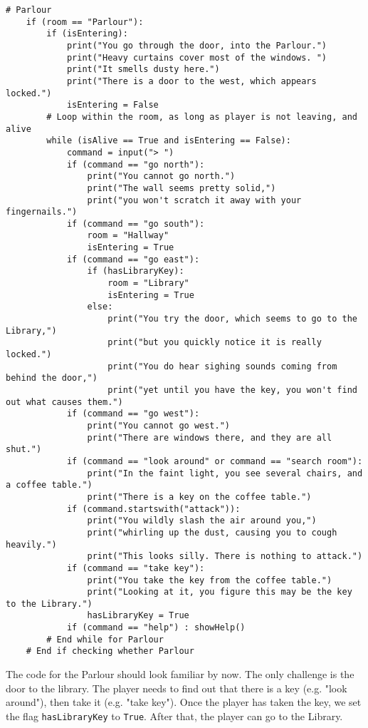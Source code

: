 \begin{lstlisting}[firstnumber=last]
    # Parlour
    if (room == "Parlour"):
        if (isEntering):
            print("You go through the door, into the Parlour.")
            print("Heavy curtains cover most of the windows. ")
            print("It smells dusty here.")
            print("There is a door to the west, which appears locked.")
            isEntering = False
        # Loop within the room, as long as player is not leaving, and alive
        while (isAlive == True and isEntering == False):
            command = input("> ")
            if (command == "go north"):
                print("You cannot go north.")
                print("The wall seems pretty solid,")
                print("you won't scratch it away with your fingernails.")
            if (command == "go south"):
                room = "Hallway"
                isEntering = True
            if (command == "go east"):
                if (hasLibraryKey):
                    room = "Library"
                    isEntering = True
                else:
                    print("You try the door, which seems to go to the Library,")
                    print("but you quickly notice it is really locked.")
                    print("You do hear sighing sounds coming from behind the door,")
                    print("yet until you have the key, you won't find out what causes them.")
            if (command == "go west"):
                print("You cannot go west.")
                print("There are windows there, and they are all shut.")
            if (command == "look around" or command == "search room"):
                print("In the faint light, you see several chairs, and a coffee table.")
                print("There is a key on the coffee table.")
            if (command.startswith("attack")):
                print("You wildly slash the air around you,")
                print("whirling up the dust, causing you to cough heavily.")
                print("This looks silly. There is nothing to attack.")
            if (command == "take key"):
                print("You take the key from the coffee table.")
                print("Looking at it, you figure this may be the key to the Library.")
                hasLibraryKey = True
            if (command == "help") : showHelp()
        # End while for Parlour
    # End if checking whether Parlour
\end{lstlisting}

The code for the Parlour should look familiar by now. The only challenge is the door to the library. The player needs to find out that there is a key (e.g. "look around"), then take it (e.g. "take key"). Once the player has taken the key, we set the flag \texttt{hasLibraryKey} to \texttt{True}. After that, the player can go to the Library. 

